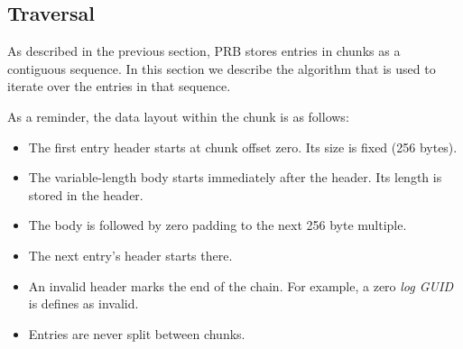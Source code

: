 \documentclass[12pt,a4paper,twoside]{book}
\begin{document}
\subsection{Traversal}\label{di:prb:traversal}
As described in the previous section, PRB stores entries in chunks as a contiguous sequence.
In this section we describe the algorithm that is used to iterate over the entries in that sequence.

As a reminder, the data layout within the chunk is as follows:
\begin{itemize}[noitemsep]
    \item The first entry header starts at chunk offset zero. Its size is fixed (256 bytes).
    \item The variable-length body starts immediately after the header. Its length is stored in the header.
    \item The body is followed by zero padding to the next 256 byte multiple.
    \item The next entry's header starts there.
    \item An invalid header marks the end of the chain. For example, a zero \textit{log GUID} is defines as invalid.
    \item Entries are never split between chunks.
\end{itemize}
\end{document}
